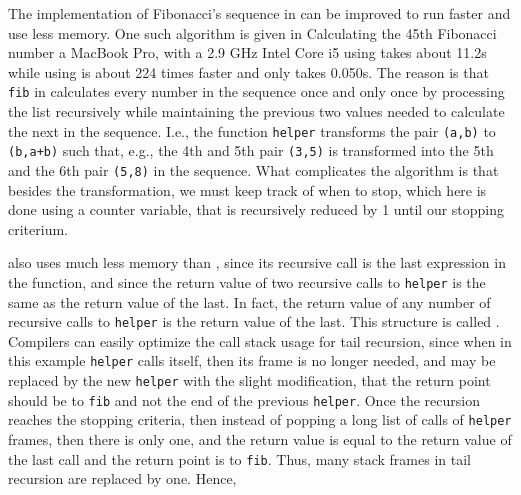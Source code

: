The implementation of Fibonacci's sequence in  can be improved to run faster and use less memory. One such algorithm is given in 
%
%
Calculating the 45th Fibonacci number a MacBook Pro, with a 2.9 GHz Intel Core i5 using  takes about 11.2s while using  is about 224 times faster and only takes 0.050s. The reason is that \lstinline{fib} in  calculates every number in the sequence once and only once by processing the list recursively while maintaining the previous two values needed to calculate the next in the sequence. I.e., the function \lstinline{helper} transforms the pair \lstinline{(a,b)} to \lstinline{(b,a+b)} such that, e.g., the 4th and 5th pair \lstinline{(3,5)} is transformed into the 5th and the 6th pair \lstinline{(5,8)} in the sequence. What complicates the algorithm is that besides the transformation, we must keep track of when to stop, which here is done using a counter variable, that is recursively reduced by 1 until our stopping criterium.

 also uses much less memory than , since its recursive call is the last expression in the function, and since the return value of two recursive calls to \lstinline{helper} is the same as the return value of the last. In fact, the return value of any number of recursive calls to \lstinline{helper} is the return value of the last. This structure is called . Compilers can easily optimize the call stack usage for tail recursion, since when in this example \lstinline{helper} calls itself, then its frame is no longer needed, and may be replaced by the new \lstinline{helper} with the slight modification, that the return point should be to \lstinline{fib} and not the end of the previous \lstinline{helper}. Once the recursion reaches the stopping criteria, then instead of popping a long list of calls of \lstinline{helper} frames, then there is only one, and the return value is equal to the return value of the last call and the return point is to \lstinline{fib}. Thus, many stack frames in tail recursion are replaced by one. Hence, 


